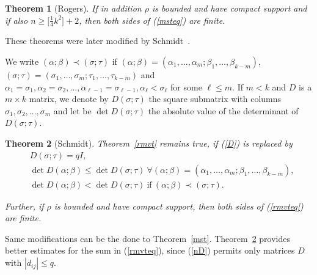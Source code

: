 \documentclass[11pt]{article}
\newtheorem{theorem}{Theorem}[section]
\theoremstyle{definition}
\theoremstyle{proof}
\begin{document}
\begin{theorem}[Rogers]
    If in addition $\rho$ is bounded and have compact support and if also $n \geq  \big[\frac{1}{4} k ^2\big] + 2$, then both sides of (\ref{msteq}) are finite.
\end{theorem}

These theorems were later modified by Schmidt~\cite{schmidt58}.

We write $(\alpha; \beta ) \prec (\sigma ; \tau )$ if $(\alpha ; \beta ) = ( \alpha _1, \ldots, \alpha _m; \beta _1, \ldots, \beta _{k-m})$, $(\sigma ; \tau ) = (\sigma _1, \ldots, \sigma _m; \tau _1, \ldots, \tau _{k-m})$ and $\alpha _1 = \sigma _1, \alpha _2 = \sigma _2, \ldots , \alpha _{\ell - 1} = \sigma _{\ell - 1}, \alpha _\ell < \sigma _\ell  $ for some $\ell \leq m$.
If $m<k$ and $D$ is a $m \times k$ matrix, we denote by $D(\sigma ; \tau )$ the square submatrix with columns $\sigma _1, \sigma _2, \ldots , \sigma _m$ and let be $\det D(\sigma ; \tau )$ the absolute value of the determinant of $D(\sigma; \tau )$.

\begin{theorem}[Schmidt]\label{schmvt}
    Theorem~\ref{rmvt} remains true, if (\ref{D}) is replaced by
    \begin{equation}\label{nD}
        \begin{split}
            & D(\sigma ; \tau ) = qI, \\
            & \det D(\alpha ; \beta ) \leq  \det D (\sigma ; \tau ) \ \forall (\alpha ; \beta ) = (\alpha _1, \ldots, \alpha _m ; \beta _1, \ldots, \beta _{k-m}), \\
            & \det D(\alpha; \beta ) < \det D(\sigma; \tau ) \ \text{if} \ (\alpha; \beta ) \prec (\sigma ; \tau ).
        \end{split}
    \end{equation}

    Further, if $\rho$ is bounded and have compact support, then both sides of (\ref{rmvteq}) are finite.
\end{theorem}

Same modifications can be the done to Theorem~\ref{mst}.
Theorem~\ref{schmvt} provides better estimates for the sum in (\ref{rmvteq}), since (\ref{nD}) permits only matrices $D$ with $|d_{ij}| \leq q$.
\end{document}
